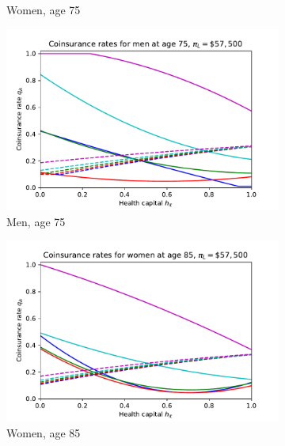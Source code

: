 \documentclass[12pt,pdftex,letterpaper]{article}
\begin{document}
\begin{figure}[h!]
\begin{subfigure}[b]{0.49\textwidth}
        \caption{Women, age 75}
    \end{subfigure}
    \begin{subfigure}[b]{0.49\textwidth}
        \centering
        \includegraphics[width=\textwidth]{../Figures/SocOpt57CopayMen75.pdf}
        \caption{Men, age 75}
    \end{subfigure}
    \begin{subfigure}[b]{0.49\textwidth}
        \centering
        \includegraphics[width=\textwidth]{../Figures/SocOpt57CopayWomen85.pdf}
        \caption{Women, age 85}
    \end{subfigure}
    \begin{subfigure}[b]{0.49\textwidth}
        \centering

\end{subfigure}
\end{figure}
\end{document}
